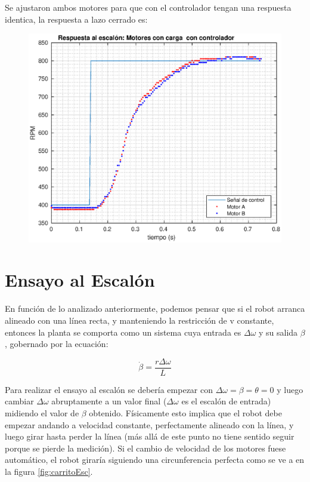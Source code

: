 \documentclass[10pt,conference,a4paper,onecolumn]{article}%
\begin{document}
Se ajustaron ambos motores para que con el controlador tengan una respuesta identica, la respuesta a lazo cerrado es:
\begin{figure}[h]
\centering
\includegraphics[width=15cm]{./imagenes/resp_escalon_motores_controlados_2}
\end{figure}

\section{Ensayo al Escalón}

En función de lo analizado anteriormente, podemos pensar que si el robot arranca alineado con una línea recta, y manteniendo la restricción de v constante, entonces la planta se comporta como un sistema cuya entrada es $\Delta \omega$ y su salida $\beta $, gobernado por la ecuación:

\begin{equation}
\dot{\beta}= \frac{r\Delta\omega}{L} 
\label{eq:sys_tot_teo} 
\end{equation}

Para realizar el ensayo al escalón se debería empezar con $\Delta \omega = \beta = \theta=0$  y luego cambiar $\Delta \omega$  abruptamente a un valor final ($\Delta \omega$  es el escalón de entrada) midiendo el valor de $\beta$ obtenido. Físicamente esto implica que el robot debe empezar andando a velocidad constante, perfectamente alineado con la línea, y luego girar hasta perder la línea (más allá de este punto no tiene sentido seguir porque se pierde la medición).
Si el cambio de velocidad de los motores fuese automático, el robot giraría siguiendo una circunferencia perfecta como se ve a en la figura \ref{fig:carritoEsc}.
\end{document}
